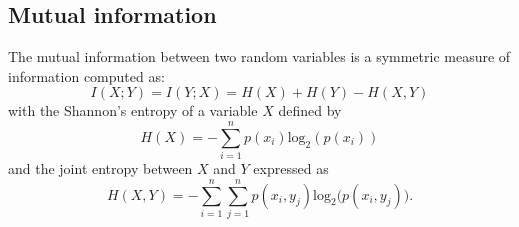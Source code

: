 \subsection*{Mutual information}
The mutual information between two random variables is a symmetric measure of information computed as:
\begin{equation}\label{eq:mutual_information}
	I\left(X;Y\right) =I\left(Y;X\right) = H(X) + H(Y) - H(X,Y)
\end{equation}
with the Shannon's entropy of a variable $X$ defined by 
\begin{equation}\label{eq:entropy}
	H(X) = -\sum_{i=1}^{n}p(x_i)\text{log}_2\left(p\left(x_i\right)\right)
\end{equation}
and the joint entropy between $ X $ and $ Y $ expressed as
\begin{equation}\label{eq:joint_entropy}
	H(X,Y) = -\sum_{i=1}^{n}\sum_{j=1}^{n} p(x_i,y_j)\text{log}_2\big(p\left(x_i,y_j\right)\big).
\end{equation}

